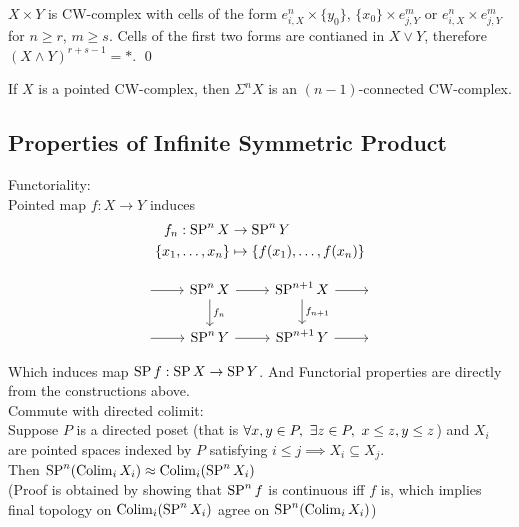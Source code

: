     \begin{prf}
        $X \times Y$ is CW-complex with cells of the form
        $e^n_{i,X} \times \{y_0\}$, $\{x_0\} \times e^m_{j,Y}$
        or $e^n_{i,X} \times e^m_{j,Y}$
        for $n \geq r$, $m \geq s$.
        Cells of the first two forms are contianed in $X \vee Y$,
        therefore $(X \wedge Y)^{r+s-1} = \ast$.
        \qed
    \end{prf}

    \begin{cor}
        If $X$ is a pointed CW-complex,
        then $\Sigma^n X$ is an $(n-1)$-connected CW-complex.
    \end{cor}

    \subsection{Properties of Infinite Symmetric Product}
    Functoriality:\\

    Pointed map $f : X \to Y$
    induces
    \begin{align*}
        f_n : \operatorname{SP}^n X & \to \operatorname{SP}^{n}Y\\
            \{x_1, \dots, x_n\} & \mapsto \{f(x_1), \dots, f(x_n)\}
    \end{align*}
    
    \[\begin{tikzcd}
        {} & {\SP^n X} & {\SP^{n+1}X} & {} \\
        {} & {\SP^nY} & {\SP^{n+1} Y} & {}
        \arrow[from=1-2, to=1-3]
        \arrow[from=1-1, to=1-2]
        \arrow[from=2-1, to=2-2]
        \arrow["{f_n}", from=1-2, to=2-2]
        \arrow[from=2-2, to=2-3]
        \arrow["{f_{n+1}}", from=1-3, to=2-3]
        \arrow[from=2-3, to=2-4]
        \arrow[from=1-3, to=1-4]
    \end{tikzcd}\]

    Which induces map $\operatorname{SP} f : \operatorname{SP} X \to \operatorname{SP} Y$.
    And Functorial properties are directly from the constructions above.\\

    \label{hyp:SP-commute-with-directed-colimit} Commute with directed colimit:\\
    Suppose $P$ is a directed poset (that is $\A x,y \in P, \ \E z \in P, \ x \leq z , y \leq z$)
    and $X_i$ are pointed spaces indexed by $P$ satisfying $i \leq j \implies X_i \subseteq X_j$.\\
    Then $\operatorname{SP}^n (\operatorname{Colim}_{i} X_i) \approx \operatorname{Colim}_{i} (\operatorname{SP}^n X_i)$\\
    (Proof is obtained by showing that $ \operatorname{SP}^n f $ is continuous iff $f$ is,
    which implies final topology on $\operatorname{Colim}_{i} (\operatorname{SP}^n X_i)$ agree on $\operatorname{SP}^n (\operatorname{Colim}_i X_i)$)\\

